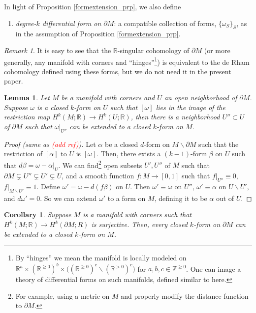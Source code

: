 \documentclass[11pt]{article}
\newtheorem{lmm}[thm]{Lemma}
\newtheorem{crl}[thm]{Corollary}
\theoremstyle{definition}
\theoremstyle{remark}
\newtheorem{rmk}[thm]{Remark}
\def\Z{\mathbb{Z}}
\def\R{\mathbb{R}}
\begin{document}
\begin{appendices}
In light of Proposition \ref{formextension_prp}, we also define
\begin{enumerate}[label=$\cdot$, nolistsep]
\item {\it degree-$k$ differential form on $\partial M$}: a compatible collection of forms, $\{\omega_S\}_S$, as in the assumption of Proposition \ref{formextension_prp}. 
\end{enumerate}
\begin{rmk}
It is easy to see that the $\R$-singular cohomology of $\partial M$ (or more generally, any manifold with corners and ``hinges''\footnote{By ``hinges'' we mean the manifold is locally modeled on $\R^a\times(\R^{\ge0})^b\times\big((\R^{\ge0})^c\backslash(\R^{>0})^c\big)$ for $a,b,c\in\Z^{\ge0}$. One can image a theory of differential forms on such manifolds, defined similar to here.}) is equivalent to the de Rham cohomology defined using these forms, but we do not need it in the present paper.
\end{rmk}


\begin{lmm}\label{formextension_lmm}
Let $M$ be a manifold with corners and $U$ an open neighborhood of $\partial M$. 
Suppose $\omega$ is a closed $k$-form on $U$ such that $[\omega]$ lies in the image of the restriction map $H^k(M;\R)\to H^k(U;\R)$, 
then there is a neighborhood $U''\subset U$ of $\partial M$ such that $\omega|_{U''}$ can be extended to a closed $k$-form on $M$. 
\end{lmm}

\begin{proof}[Proof (same as \textcolor{red}{(add ref)})]
Let $\alpha$ be a closed $d$-form on $M\backslash{\partial M}$ such that the restriction of $[\alpha]$ to $U$ is $[\omega]$. 
Then, there exists a $(k-1)$-form $\beta$ on $U$ such that $d\beta=\omega-\alpha|_{U}$. 
We can find\footnote{For example, using a metric on $M$ and properly modify the distance function to $\partial M$.} open subsets $U',U''$ of $M$ such that $\partial M\subsetneq U''\subsetneq U'\subsetneq U$, and a smooth function $f:M\to[0,1]$ such that $f|_{U''}\equiv 0$, $f|_{M\backslash U'}\equiv1$. 
Define $\omega'=\omega-d(f\beta)$ on $U$. Then $\omega'\equiv\omega$ on $U''$, $\omega'\equiv\alpha$ on $U\backslash U'$, and $d\omega'=0$. So we can extend $\omega'$ to a form on $M$, defining it to be $\alpha$ out of $U$. 
\end{proof}

\begin{crl}\label{formextension_crl}
Suppose $M$ is a manifold with corners such that $H^k(M;\R)\to H^k(\partial M;R)$ is surjective. Then, every closed $k$-form on $\partial M$ can be extended to a closed $k$-form on $M$. 
\end{crl}


\end{appendices}
\end{document}
